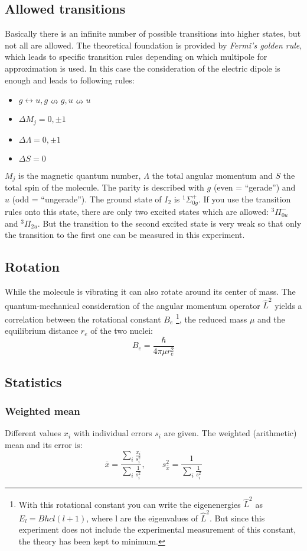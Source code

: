 \subsection{Allowed transitions}
Basically there is an infinite number of possible transitions into higher states, but not all are allowed. The theoretical foundation is provided 
by \emph{Fermi's golden rule}, which leads to specific transition rules depending on which multipole for approximation is used. In this case the consideration of the 
electric dipole is enough and leads to following rules:
\begin{itemize}
  \item $g \leftrightarrow u, g \nleftrightarrow g, u \nleftrightarrow u$
  \item $\Delta M_j = 0, \pm 1$
  \item $\Delta \Lambda = 0, \pm 1$
  \item $\Delta S = 0$
\end{itemize}
$M_j$ is the magnetic quantum number, $\Lambda$ the total angular momentum and $S$ the total spin of the molecule. The parity is described with
$g$ (even = ``gerade'') and $u$ (odd = ``ungerade''). The ground state of $I_2$ is ${}^{1}\Sigma_{0g}^+$. 
If you use the transition rules onto this state, there are only two excited states which are 
allowed: ${}^3 \Pi_{0u}^-$ and ${}^3 \Pi_{2u}$. But the transition to the second excited state is very weak so that only the transition to the 
first one can be measured in this experiment.


\subsection{Rotation}
While the molecule is vibrating it can also rotate around its center of mass. The quantum-mechanical consideration of the angular momentum 
operator $\hat{L}^2$ yields a correlation between the rotational constant $B_e$
\footnote{With this rotational constant you can write the eigenenergies $\hat{L}^2$ as $E_l = B h c l (l+1)$, where l are the eigenvalues of $\hat{L}^2$. 
But since this experiment does not include the experimental measurement of this constant, the theory has been kept to minimum.}, 
the reduced mass $\mu$ and the equilibrium distance $r_e$ of the two nuclei:
\begin{equation}
  \label{eq:rotconst}
  B_e = \frac{\hbar}{4 \pi \mu r_e^2}
\end{equation}

\subsection{Statistics}
\label{sub:statistics}
\subsubsection{Weighted mean}
Different values $x_i$ with individual errors $s_i$ are given. The weighted (arithmetic) mean and its error is:
\begin{equation}
\label{eq:meanw}
  \bar{x} = \frac{\sum_i \frac{x_i}{s_i^2}}{\sum_i \frac{1}{s_i^2}}, \qquad s_{\bar{x}}^2 = \frac{1}{\sum_i \frac{1}{s_i^2}}
\end{equation}